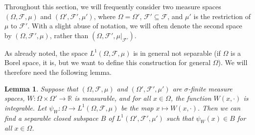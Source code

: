\documentclass{amsart}
\numberwithin{equation}{section}
\numberwithin{figure}{section}
\newtheorem{lemma}[theorem]{Lemma}
\theoremstyle{definition}
\theoremstyle{remark}
\newcommand{\RR}{\mathbb{R}}
\newcommand{\cF}{\mathcal{F}}
\begin{document}
Throughout this section, we will frequently consider two measure spaces
$(\Omega,\cF,\mu)$ and $(\Omega',\cF',\mu')$, where $\Omega=\Omega'$,
$\cF'\subseteq \cF$, and $\mu'$ is the restriction of $\mu$ to $\cF'$. With a
slight abuse of notation, we will often denote the second space by
$(\Omega,\cF',\mu)$, rather than $(\Omega,\cF',\mu|_{\cF'})$.

As already noted, the space $L^1(\Omega,\cF,\mu)$ is in general not separable
(if $\Omega$ is a Borel space, it is, but we want to define this construction
for general $\Omega$). We will therefore need the following lemma.

\begin{lemma} \label{lemmamapseparable}
Suppose that $(\Omega,\cF,\mu)$ and $(\Omega',\cF',\mu')$ are $\sigma$-finite
measure spaces, $W\colon \Omega \times \Omega' \rightarrow {\RR}$ is
measurable, and for all $x\in\Omega$, the function $W(x,\cdot)$ is
integrable. Let $\psi_W\colon \Omega \rightarrow L^1(\Omega,\cF,\mu)$ be the
map $x \mapsto W(x,\cdot)$. Then we can find a separable closed subspace $B$
of $L^1(\Omega',\cF'{,\mu'})$ such that $\psi_W(x)\in B$ for all $x\in
\Omega$.
\end{lemma}
\end{document}
